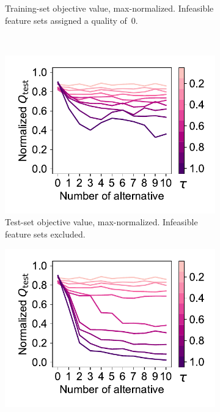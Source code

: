 \documentclass{article}
\theoremstyle{definition}
\begin{document}
\begin{figure}[p]
\begin{subfigure}[t]{0.48\textwidth}
		\caption{
			Training-set objective value, max-normalized.
			Infeasible feature sets assigned a quality of~0.
		}
		\label{fig:afs:impact-num-alternatives-tau-train-objective-max-fillna}
	\end{subfigure}
	\\ \vspace{\baselineskip}
	\begin{subfigure}[t]{0.48\textwidth}
		\centering
		\includegraphics[width=\textwidth, trim=15 17 10 15, clip]{plots/afs-impact-num-alternatives-tau-test-objective-max.pdf}
		\caption{
			Test-set objective value, max-norma\-lized.
			Infeasible feature sets excluded.
		}
		\label{fig:afs:impact-num-alternatives-tau-test-objective-max}
	\end{subfigure}
	\hfill
	\begin{subfigure}[t]{0.48\textwidth}
		\centering
		\includegraphics[width=\textwidth, trim=15 17 10 15, clip]{plots/afs-impact-num-alternatives-tau-test-objective-max-fillna.pdf}

\end{subfigure}
\end{figure}
\end{document}
